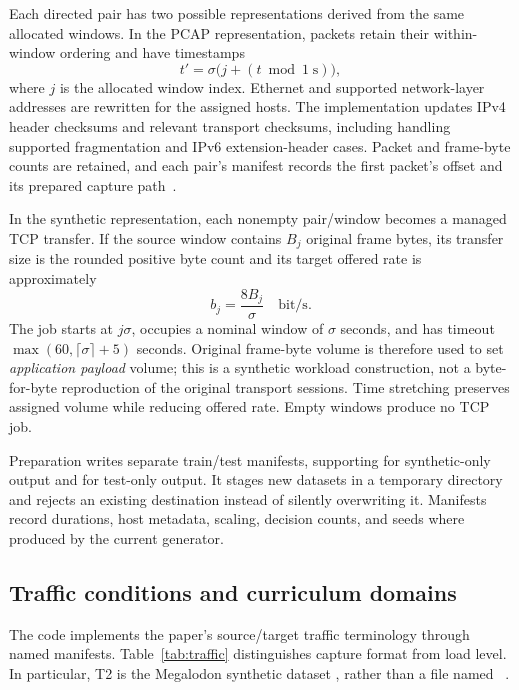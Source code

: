 \documentclass[11pt,a4paper]{article}
\newcommand{\code}[1]{\texttt{\detokenize{#1}}}
\begin{document}
Each directed pair has two possible representations derived from the same
allocated windows. In the PCAP representation, packets retain their
within-window ordering and have timestamps
\begin{equation}
  t' = \sigma\bigl(j+(t\bmod 1\;\mathrm{s})\bigr),
\end{equation}
where $j$ is the allocated window index. Ethernet and supported network-layer
addresses are rewritten for the assigned hosts. The implementation updates
IPv4 header checksums and relevant transport checksums, including handling
supported fragmentation and IPv6 extension-header cases. Packet and frame-byte
counts are retained, and each pair's manifest records the first packet's offset
and its prepared capture path~\cite{code-data}.

In the synthetic representation, each nonempty pair/window becomes a managed
TCP transfer. If the source window contains $B_j$ original frame bytes, its
transfer size is the rounded positive byte count and its target offered rate
is approximately
\begin{equation}
  b_j=\frac{8B_j}{\sigma}\quad\mathrm{bit/s}.
\end{equation}
The job starts at $j\sigma$, occupies a nominal window of $\sigma$ seconds,
and has timeout $\max(60,\lceil\sigma\rceil+5)$ seconds. Original frame-byte
volume is therefore used to set \emph{application payload} volume; this is a
synthetic workload construction, not a byte-for-byte reproduction of the
original transport sessions. Time stretching preserves assigned volume while
reducing offered rate. Empty windows produce no TCP job.

Preparation writes separate train/test manifests, supporting \code{--skip-pcaps}
for synthetic-only output and \code{--skip-train} for test-only output. It stages
new datasets in a temporary directory and rejects an existing destination
instead of silently overwriting it. Manifests record durations, host metadata,
scaling, decision counts, and seeds where produced by the current generator.

\subsection{Traffic conditions and curriculum domains}
\label{sec:curriculum-data}

The code implements the paper's source/target traffic terminology through
named manifests. Table~\ref{tab:traffic} distinguishes capture format from
load level. In particular, T2 is the Megalodon synthetic dataset
\code{mg_t0}, rather than a file named \code{dc_t2}~\cite{code-data,code-datasets}.
\end{document}
